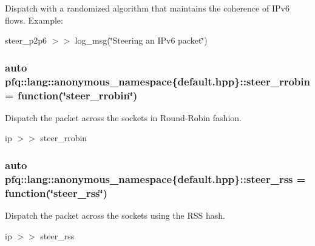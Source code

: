 Dispatch with a randomized algorithm that maintains the coherence of I\+Pv6 flows. Example\+:

steer\+\_\+p2p6 $>$$>$ log\+\_\+msg(\char`\"{}\+Steering an I\+Pv6 packet\char`\"{}) 
\subsubsection[{\texorpdfstring{steer\+\_\+rrobin}{steer_rrobin}}]{\setlength{\rightskip}{0pt plus 5cm}auto pfq\+::lang\+::anonymous\+\_\+namespace\{default.\+hpp\}\+::steer\+\_\+rrobin = {\bf function}(\char`\"{}steer\+\_\+rrobin\char`\"{})}\hypertarget{namespacepfq_1_1lang_1_1anonymous__namespace_02default_8hpp_03_a98f503710ebfe66f6866d642af30b1a8}{}\label{namespacepfq_1_1lang_1_1anonymous__namespace_02default_8hpp_03_a98f503710ebfe66f6866d642af30b1a8}


Dispatch the packet across the sockets in Round-\/\+Robin fashion. 

ip $>$$>$ steer\+\_\+rrobin 
\subsubsection[{\texorpdfstring{steer\+\_\+rss}{steer_rss}}]{\setlength{\rightskip}{0pt plus 5cm}auto pfq\+::lang\+::anonymous\+\_\+namespace\{default.\+hpp\}\+::steer\+\_\+rss = {\bf function}(\char`\"{}steer\+\_\+rss\char`\"{})}\hypertarget{namespacepfq_1_1lang_1_1anonymous__namespace_02default_8hpp_03_ae5f71a205afe1a8e3ed959d4c555fcb9}{}\label{namespacepfq_1_1lang_1_1anonymous__namespace_02default_8hpp_03_ae5f71a205afe1a8e3ed959d4c555fcb9}


Dispatch the packet across the sockets using the R\+SS hash. 

ip $>$$>$ steer\+\_\+rss 
